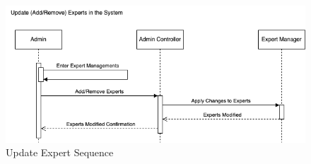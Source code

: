 \begin{figure}[H]
	\centering
	\includegraphics[width=\textwidth, height=\textheight, keepaspectratio]{Section3/images/UpdateExpertsSequenceDiagram.drawio.png}
	\caption{Update Expert Sequence}
	\label{UpdateExpertSequence}
\end{figure}